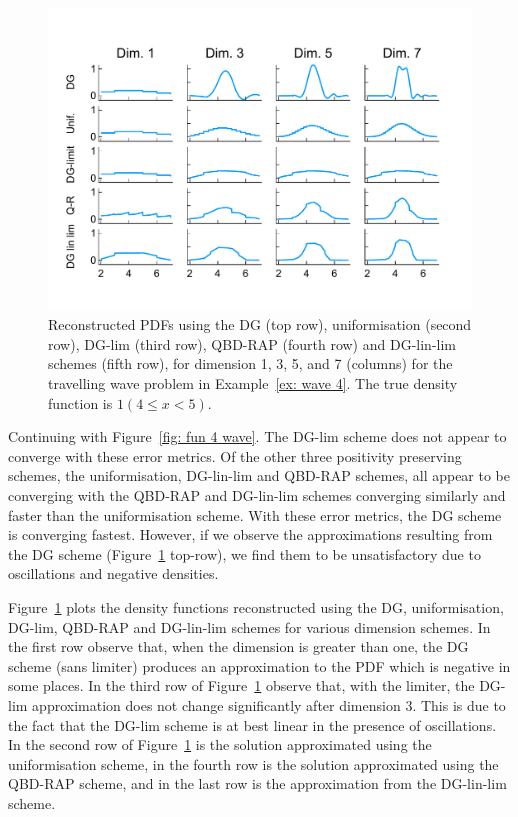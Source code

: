 \begin{example}
\begin{figure}[h]
	\centering
	\includegraphics[width=\textwidth,trim={0cm 1.25cm 0cm 1.25cm},clip]{chapter6/figs/wave/fun4/pdfs_formatted.pdf}
	\caption{Reconstructed PDFs using the DG (top row), uniformisation (second row), DG-lim (third row), QBD-RAP (fourth row) and DG-lin-lim schemes (fifth row), for dimension 1, 3, 5, and 7 (columns) for the travelling wave problem in Example~\ref{ex: wave 4}. The true density function is \(1(4\leq x<5)\).}
	\label{fig: pdf wave fun 4} 
\end{figure}
Continuing with Figure~\ref{fig: fun 4 wave}. The DG-lim scheme does not appear to converge with these error metrics. Of the other three positivity preserving schemes, the uniformisation, DG-lin-lim and QBD-RAP schemes, all appear to be converging with the QBD-RAP and  DG-lin-lim schemes converging similarly and faster than the uniformisation scheme. With these error metrics, the DG scheme is converging fastest. However, if we observe the approximations resulting from the DG scheme (Figure~\ref{fig: pdf wave fun 4} top-row), we find them to be unsatisfactory due to oscillations and negative densities. 

Figure~\ref{fig: pdf wave fun 4} plots the density functions reconstructed using the DG, uniformisation, DG-lim, QBD-RAP and DG-lin-lim schemes for various dimension schemes. In the first row observe that, when the dimension is greater than one, the DG scheme (sans limiter) produces an approximation to the PDF which is negative in some places. In the third row of Figure~\ref{fig: pdf wave fun 4} observe that, with the limiter, the DG-lim approximation does not change significantly after dimension 3. This is due to the fact that the DG-lim scheme is at best linear in the presence of oscillations. In the second row of Figure~\ref{fig: pdf wave fun 4} is the solution approximated using the uniformisation scheme, in the fourth row is the solution approximated using the QBD-RAP scheme, and in the last row is the approximation from the DG-lin-lim scheme.


\end{example}
